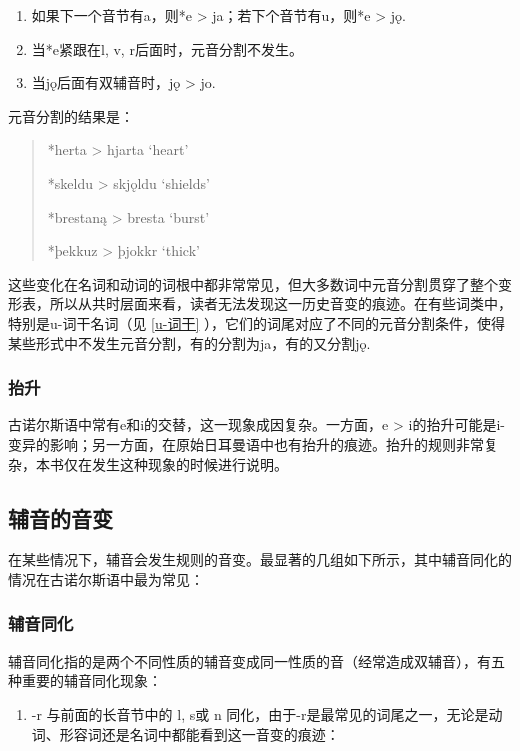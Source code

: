 \begin{info}
  \begin{enumerate}
    \item 如果下一个音节有a，则*e > ja；若下个音节有u，则*e > jǫ.
    \item 当*e紧跟在l, v, r后面时，元音分割不发生。
    \item 当jǫ后面有双辅音时，jǫ > jo.
  \end{enumerate}
\end{info}

元音分割的结果是：

\begin{quote}
  *herta > hjarta `heart'

  *skeldu > skjǫldu `shields'

  *brestaną > bresta `burst'

  *þekkuz > þjokkr `thick'
\end{quote}

这些变化在名词和动词的词根中都非常常见，但大多数词中元音分割贯穿了整个变形表，所以从共时层面来看，读者无法发现这一历史音变的痕迹。在有些词类中，特别是u-词干名词（见 \ref{u-词干} ），它们的词尾对应了不同的元音分割条件，使得某些形式中不发生元音分割，有的分割为ja，有的又分割jǫ.

\subsubsection{抬升}
\label{抬升}

古诺尔斯语中常有e和i的交替，这一现象成因复杂。一方面，e > i的抬升可能是i-变异的影响；另一方面，在原始日耳曼语中也有抬升的痕迹。抬升的规则非常复杂，本书仅在发生这种现象的时候进行说明。

\subsection{辅音的音变}
\label{辅音的音变}

在某些情况下，辅音会发生规则的音变。最显著的几组如下所示，其中辅音同化的情况在古诺尔斯语中最为常见：

\subsubsection{辅音同化}
\label{辅音同化}

辅音同化指的是两个不同性质的辅音变成同一性质的音（经常造成双辅音），有五种重要的辅音同化现象：

\begin{enumerate}
  \def\labelenumi{(\alph{enumi})}
  \item
        \label{_Ref117517668}{}-r 与前面的长音节中的 l, s或 n
        同化，由于-r是最常见的词尾之一，无论是动词、形容词还是名词中都能看到这一音变的痕迹：
\end{enumerate}


